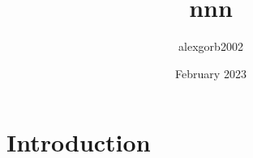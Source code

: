 \documentclass{article}
\title{nnn}
\author{alexgorb2002 }
\date{February 2023}
\begin{document}
\maketitle

\section{Introduction}
\end{document}
